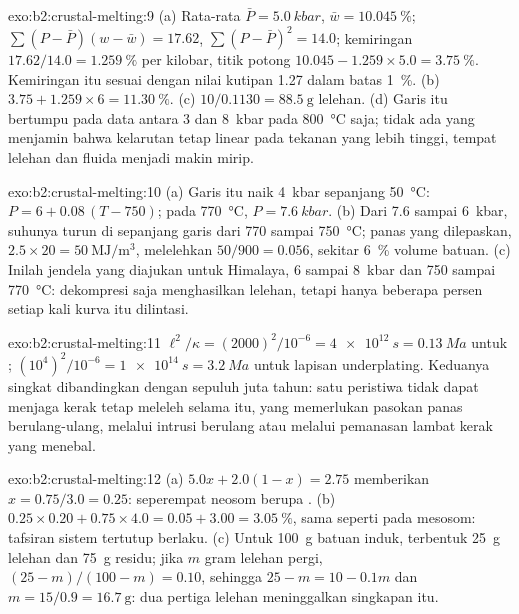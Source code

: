 \begin{solution}{exo:b2:crustal-melting:9}
(a) Rata-rata $\bar P = \qty{5.0}{kbar}$, $\bar w = \qty{10.045}{\percent}$;
$\sum(P - \bar P)(w - \bar w) = 17.62$, $\sum(P - \bar P)^2 = 14.0$; kemiringan
$17.62/14.0 = \qty{1.259}{\percent}$ per kilobar, titik potong $10.045 - 1.259\times5.0 =
\qty{3.75}{\percent}$. Kemiringan itu sesuai dengan nilai kutipan 1.27 dalam batas
\qty{1}{\percent}. (b) $3.75 + 1.259\times6 = \qty{11.30}{\percent}$. (c) $10/0.1130 =
\qty{88.5}{\gram}$ lelehan. (d) Garis itu bertumpu pada data antara 3 dan \qty{8}{kbar} pada
\qty{800}{\celsius} saja; tidak ada yang menjamin bahwa kelarutan tetap linear pada tekanan
yang lebih tinggi, tempat lelehan dan fluida menjadi makin mirip.
\end{solution}

\begin{solution}{exo:b2:crustal-melting:10}
(a) Garis itu naik \qty{4}{kbar} sepanjang \qty{50}{\celsius}: $P = 6 + 0.08\,(T - 750)$;
pada \qty{770}{\celsius}, $P = \qty{7.6}{kbar}$. (b) Dari 7.6 sampai \qty{6}{kbar},
suhunya turun di sepanjang garis dari 770 sampai \qty{750}{\celsius}; panas yang dilepaskan,
$2.5\times20 = \qty{50}{\mega\joule\per\cubic\metre}$, melelehkan $50/900 = 0.056$, sekitar
\qty{6}{\percent} volume batuan. (c) Inilah jendela yang diajukan untuk
 Himalaya, 6 sampai \qty{8}{kbar} dan 750 sampai \qty{770}{\celsius}: dekompresi
saja menghasilkan lelehan, tetapi hanya beberapa persen setiap kali kurva itu dilintasi.
\end{solution}

\begin{solution}{exo:b2:crustal-melting:11}
$\ell^2/\kappa = (2000)^2/10^{-6} = \qty{4e12}{s} = \qty{0.13}{Ma}$ untuk ;
$(10^4)^2/10^{-6} = \qty{1e14}{s} = \qty{3.2}{Ma}$ untuk lapisan underplating. Keduanya singkat
dibandingkan dengan sepuluh juta tahun: satu peristiwa tidak dapat menjaga kerak tetap meleleh selama itu, yang memerlukan
pasokan panas berulang-ulang, melalui intrusi berulang atau melalui pemanasan lambat kerak yang
menebal.
\end{solution}

\begin{solution}{exo:b2:crustal-melting:12}
(a) $5.0x + 2.0(1 - x) = 2.75$ memberikan $x = 0.75/3.0 = 0.25$: seperempat neosom berupa
. (b) $0.25\times0.20 + 0.75\times4.0 = 0.05 + 3.00 = \qty{3.05}{\percent}$, sama seperti
pada mesosom: tafsiran sistem tertutup berlaku. (c) Untuk \qty{100}{\gram}
batuan induk, terbentuk \qty{25}{\gram} lelehan dan \qty{75}{\gram} residu; jika $m$ gram
lelehan pergi, $(25 - m)/(100 - m) = 0.10$, sehingga $25 - m = 10 - 0.1m$ dan $m = 15/0.9 =
\qty{16.7}{\gram}$: dua pertiga lelehan meninggalkan singkapan itu.
\end{solution}

